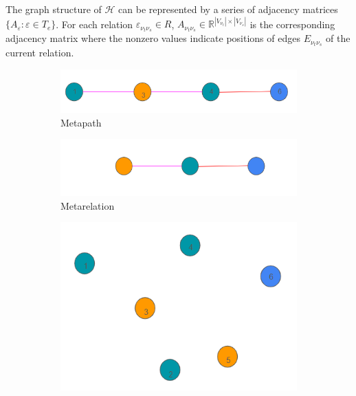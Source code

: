 \documentclass{report} %
\begin{document}
The graph structure of $\mathcal{H}$  can be represented by a series of adjacency matrices \(\{A_\varepsilon : \varepsilon \in T_e\}\). 
For each relation $\varepsilon_{\nu_t \nu_s} \in R$, $A_{\nu_t \nu_s} \in \mathbb{R}^{|V_{\nu_t}| \times |V_{\nu_s}|}$ is the corresponding 
adjacency matrix where the nonzero values indicate positions of edges $E_{\nu_t \nu_s}$ of the current relation.

\begin{figure}[H]
    \centering
    \begin{subfigure}{0.35\textwidth}
        \centering
        \includegraphics[width=\textwidth]{./ReportImages/Metapath.png}
        \caption{Metapath} 
        \label{fig:Metapath}
    \end{subfigure}\hfill
    \begin{subfigure}{0.35\textwidth}
        \centering
        \includegraphics[width=\textwidth]{./ReportImages/Metarelation.png}
        \caption{Metarelation}
        \label{fig:Metarelation}
    \end{subfigure}\vfill
    \begin{subfigure}{0.35\textwidth}
        \centering
        \includegraphics[width=\textwidth]{./ReportImages/MetapathNeighbors.png}

\end{subfigure}
\end{figure}
\end{document}
